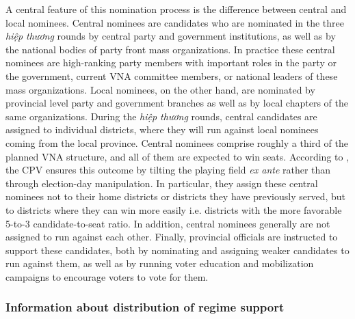 \documentclass[12pt]{article}
\newcommand{\1}{\mathbbm{1}}
\begin{document}
A central feature of this nomination process is the difference between central and local nominees. Central nominees are candidates who are nominated in the three \textit{hiệp thương} rounds by central party and government institutions, as well as by the national bodies of party front mass organizations. In practice these central nominees are high-ranking party members with important roles in the party or the government, current VNA committee members, or national leaders of these mass organizations. Local nominees, on the other hand, are nominated by provincial level party and government branches as well as by local chapters of the same organizations. During the \textit{hiệp thương} rounds, central candidates are assigned to individual districts, where they will run against local nominees coming from the local province. Central nominees comprise roughly a third of the planned VNA structure, and all of them are expected to win seats. According to \cite{MaleskySchuler2011}, the CPV ensures this outcome by tilting the playing field \textit{ex ante} rather than through election-day manipulation. In particular, they assign these central nominees not to their home districts or districts they have previously served, but to districts where they can win more easily i.e. districts with the more favorable 5-to-3 candidate-to-seat ratio. In addition,  central nominees generally are not assigned to run against each other. Finally, provincial officials are instructed to support these candidates, both by nominating and assigning  weaker candidates to run against them, as well as by running voter education and mobilization campaigns to encourage voters to vote for them. 

\subsubsection{Information about distribution of regime support}
\end{document}
